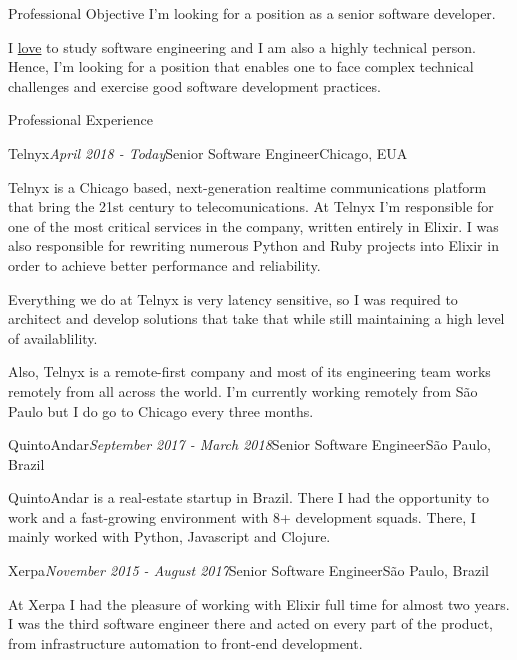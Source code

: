 \documentclass{resume} %
\begin{document}
\begin{rSection}{Professional Objective}
  I'm looking for a position as a senior software developer.

  I \underline{love} to study software engineering and I am also a highly
  technical person. Hence, I'm looking for a position that enables one to face
  complex technical challenges and exercise good software development practices.
\end{rSection}

\begin{rSection}{Professional Experience}
  \begin{rSubsection}{Telnyx}{\em April 2018 - Today}{Senior Software Engineer}{Chicago, EUA}

  \item Telnyx is a Chicago based, next-generation realtime communications
    platform that bring the 21st century to telecomunications. At Telnyx I'm
    responsible for one of the most critical services in the company, written
    entirely in Elixir. I was also responsible for rewriting numerous Python and
    Ruby projects into Elixir in order to achieve better performance and
    reliability.

    Everything we do at Telnyx is very latency sensitive, so I was required to
    architect and develop solutions that take that while still maintaining a
    high level of availablility.

    Also, Telnyx is a remote-first company and most of its engineering team
    works remotely from all across the world. I'm currently working remotely
    from São Paulo but I do go to Chicago every three months.
  \end{rSubsection}
  \begin{rSubsection}{QuintoAndar}{\em September 2017 - March 2018}{Senior Software Engineer}{São
      Paulo, Brazil}

  \item QuintoAndar is a real-estate startup in Brazil. There I had the
    opportunity to work and a fast-growing environment with 8+ development
    squads. There, I mainly worked with Python, Javascript and Clojure.
  \end{rSubsection}

  \begin{rSubsection}{Xerpa}{\em November 2015 - August 2017}{Senior Software Engineer}{São
      Paulo, Brazil}

  \item At Xerpa I had the pleasure of working with Elixir full time for almost
    two years. I was the third software engineer there and acted on every part
    of the product, from infrastructure automation to front-end development.


\end{rSubsection}
\end{rSection}
\end{document}
